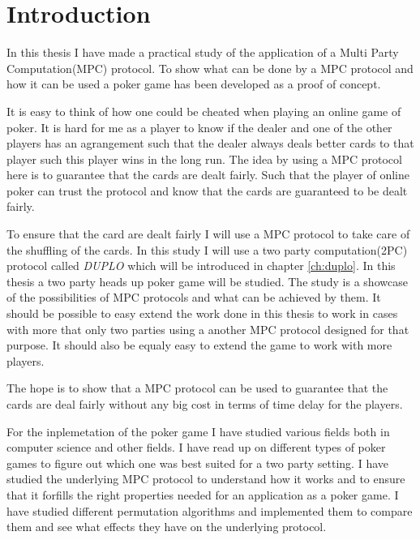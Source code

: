 \documentclass[twoside,11pt,openright]{report}
\newcommand{\DUPLO}{\textit{DUPLO} }
\begin{document}
\chapter{Introduction}
\label{ch:intro}
In this thesis I have made a practical study of the application of a Multi Party Computation(MPC) protocol. To show what can be done by a MPC protocol and how it can be used a poker game has been developed as a proof of concept.

It is easy to think of how one could be cheated when playing an online game of poker. It is hard for me as a player to know if the dealer and one of the other players has an agrangement such that the dealer always deals better cards to that player such this player wins in the long run. The idea by using a MPC protocol here is to guarantee that the cards are dealt fairly. Such that the player of online poker can trust the protocol and know that the cards are guaranteed to be dealt fairly.

To ensure that the card are dealt fairly I will use a MPC protocol to take care of the shuffling of the cards. In this study I will use a two party computation(2PC) protocol called \DUPLO which will be introduced in chapter \ref{ch:duplo}. In this thesis a two party heads up poker game will be studied. The study is a showcase of the possibilities of MPC protocols and what can be achieved by them. It should be possible to easy extend the work done in this thesis to work in cases with more that only two parties using a another MPC protocol designed for that purpose. It should also be equaly easy to extend the game to work with more players.

The hope is to show that a MPC protocol can be used to guarantee that the cards are deal fairly without any big cost in terms of time delay for the players.

\bigskip

For the inplemetation of the poker game I have studied various fields both in computer science and other fields. I have read up on different types of poker games to figure out which one was best suited for a two party setting. I have studied the underlying MPC protocol to understand how it works and to ensure that it forfills the right properties needed for an application as a poker game. I have studied different permutation algorithms and implemented them to compare them and see what effects they have on the underlying protocol.
\end{document}
